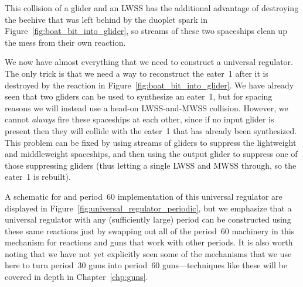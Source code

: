 This collision of a glider and an LWSS has the additional advantage of destroying the beehive that was left behind by the duoplet spark in Figure~\ref{fig:boat_bit_into_glider}, so streams of these two spaceships clean up the mess from their own reaction.

We now have almost everything that we need to construct a universal regulator. The only trick is that we need a way to reconstruct the eater~1 after it is destroyed by the reaction in Figure~\ref{fig:boat_bit_into_glider}. We have already seen that two gliders can be used to synthesize an eater~1, but for spacing reasons we will instead use a head-on LWSS-and-MWSS collision. However, we cannot \emph{always} fire these spaceships at each other, since if no input glider is present then they will collide with the eater~1 that has already been synthesized. This problem can be fixed by using streams of gliders to suppress the lightweight and middleweight spaceships, and then using the output glider to suppress one of those suppressing gliders (thus letting a single LWSS and MWSS through, so the eater~1 is rebuilt).

A schematic for and period~$60$ implementation of this universal regulator are displayed in Figure~\ref{fig:universal_regulator_periodic}, but we emphasize that a universal regulator with any (sufficiently large) period can be constructed using these same reactions just by swapping out all of the period~$60$ machinery in this mechanism for reactions and guns that work with other periods. It is also worth noting that we have not yet explicitly seen some of the mechanisms that we use here to turn period~$30$ guns into period~$60$ guns---techniques like these will be covered in depth in Chapter~\ref{chp:guns}.

